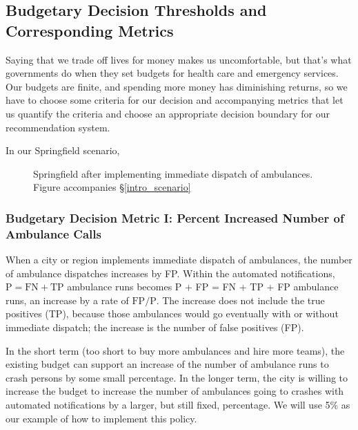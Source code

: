 \subsection{Budgetary Decision Thresholds and Corresponding Metrics}
\label{political_decisions}

Saying that we trade off lives for money makes us uncomfortable, but that's what governments do when they set budgets for health care and emergency services.  Our budgets are finite, and spending more money has diminishing returns, so we have to choose some criteria for our decision and accompanying metrics that let us quantify the criteria and choose an appropriate decision boundary for our recommendation system.  

In our Springfield scenario, 

\begin{figure}[h]
	
\caption{\normalfont\normalsize Springfield after implementing immediate dispatch of ambulances.  Figure accompanies \S\ref{intro_scenario}}
\label{methods_springfield_after}
\end{figure}

\FloatBarrier




\subsubsection{Budgetary Decision Metric I:  Percent Increased Number of Ambulance Calls}
\label{political_decisions_percent_increased}

When a city or region implements immediate dispatch of ambulances, the number of ambulance dispatches increases by FP.   Within the automated notifications, 
$\text{P} = \text{FN} + \text{TP}$
 ambulance runs becomes P + FP = FN + TP + FP ambulance runs, an increase by a rate of $\text{FP}/\text{P}$.  The increase does not include the true positives (TP), because those ambulances would go eventually with or without immediate dispatch; the increase is the number of false positives (FP).  
 
In the short term (too short to buy more ambulances and hire more teams), the existing budget can support an increase of the number of ambulance runs to crash persons by some small percentage.  In the longer term, the city is willing to increase the budget to increase the number of ambulances going to crashes with automated notifications by a larger, but still fixed, percentage.  We will use 5\% as our example of how to implement this policy.   
  
